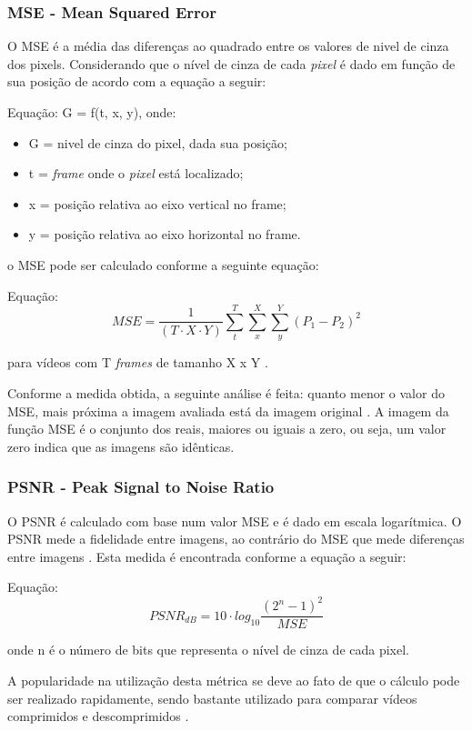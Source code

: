 \subsubsection[MSE]{MSE - Mean Squared Error}

O MSE é a média das diferenças ao quadrado entre os valores de nivel de cinza dos pixels. Considerando que o nível de cinza de cada \emph{pixel} é dado em função de sua posição de acordo com a equação a seguir:

Equação: G = f(t, x, y), onde:

\begin{itemize}
	\item G = nivel de cinza do pixel, dada sua posição;
	\item t = \emph{frame} onde o \emph{pixel} está localizado;
	\item x = posição relativa ao eixo vertical no frame;
	\item y = posição relativa ao eixo horizontal no frame.
\end{itemize}

o MSE pode ser calculado conforme a seguinte equação:

    Equação: \[MSE = \frac{1}{\left (T \cdot X \cdot Y \right )} \sum_{t}^{T} \sum_{x}^{X} \sum_{y}^{Y} \left ( P_{1} - P_{2} \right )^{2}\]

para vídeos com T \emph{frames} de tamanho X x Y \cite{winkler2005}.

    Conforme a medida obtida, a seguinte análise é feita: quanto menor o valor do MSE, mais próxima a imagem avaliada está da imagem original \cite{albini}. A imagem da função MSE é o conjunto dos reais, maiores ou iguais a zero, ou seja, um valor zero indica que as imagens são idênticas.

\subsubsection[PSNR]{PSNR - Peak Signal to Noise Ratio}
O PSNR é calculado com base num valor MSE e é dado em escala logarítmica. O PSNR mede a fidelidade entre imagens, ao contrário do MSE que mede diferenças entre imagens \cite{winkler2005}. Esta medida é encontrada conforme a equação a seguir:

Equação: \[PSNR_{dB} = 10 \cdot log_{10} \frac{{\left(2^{n} -1 \right )}^{2}}{MSE}\]

onde n é o número de bits que representa o nível de cinza de cada pixel.

A popularidade na utilização desta métrica se deve ao fato de que o cálculo pode ser realizado rapidamente, sendo bastante utilizado para comparar vídeos comprimidos e descomprimidos \cite{emmersonsilva, richardson2003}.

